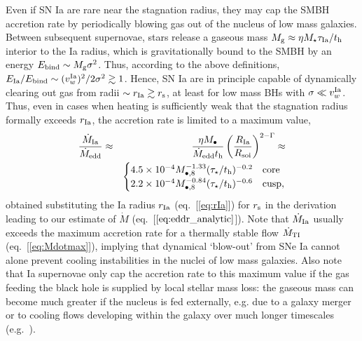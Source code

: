 \documentclass[usenatbib,fleqn]{mn2e}
\newcommand{\Mbheight}{M_{\bullet,8}}
\begin{document}
Even if SN Ia are rare near the stagnation radius, they may cap the SMBH accretion rate by periodically blowing gas out of the nucleus of low mass galaxies.  Between subsequent supernovae, stars release a gaseous mass $M_{\rm g} \approx \eta M_{\star}\tau_{\rm Ia}/t_{\rm h}$ interior to the Ia radius, which is gravitationally bound to the SMBH by an energy $E_{\rm bind} \sim M_{\rm g}\sigma^{2}$.  Thus, according to the above definitions, $E_{\rm Ia}/E_{\rm bind} \sim (v_{w}^{\rm Ia})^{2}/2\sigma^{2} \gtrsim 1$.  Hence, SN Ia are in principle capable of dynamically clearing out gas from radii $\sim r_{\rm Ia} \gtrsim r_{\rm s}$, at least for low mass BHs with $\sigma \ll v^{\rm Ia}_{w}$.  Thus, even in cases when heating is sufficiently weak that the stagnation radius formally exceeds $r_{\rm Ia}$, the accretion rate is limited to a maximum value, 
\begin{eqnarray}
\frac{\dot{M}_{\rm Ia}}{\dot{M}_{\rm edd}} &\approx& \frac{\eta M_{\bullet}}{\dot{M}_{\rm edd} t_{\rm h}}\left(\frac{R_{\rm Ia}}{R_{\rm soi}}\right)^{2-\Gamma} \approx \nonumber \\
 && \begin{cases}
    4.5 \times 10^{-4} M_{\bullet,8}^{-1.33}(\tau_{\star}/t_{\rm h})^{-0.2}
   & \text{core} \\
    2.2 \times 10^{-4} \Mbheight^{-0.84}(\tau_{\star}/t_{\rm h})^{-0.6}   & \text{cusp},
  \end{cases}
  \label{eq:eddr_Ia}
\end{eqnarray}
obtained substituting the Ia radius $r_{\rm Ia}$ (eq.~[\ref{eq:rIa}]) for $r_{\rm s}$ in the derivation leading to our estimate of $\dot{M}$ (eq.~[$\ref{eq:eddr_analytic}$]).  Note that $\dot{M}_{\rm Ia}$ usually exceeds the maximum accretion rate for a thermally stable flow $\dot{M}_{\rm TI}$ (eq.~[\ref{eq:Mdotmax}]), implying that dynamical `blow-out' from SNe Ia cannot alone prevent cooling instabilities in the nuclei of low mass galaxies.  Also note that Ia supernovae only cap the accretion rate to this maximum value if the gas feeding the black hole is supplied by local stellar mass loss: the gaseous mass can become much greater if the nucleus is fed externally, e.g. due to a galaxy merger or to cooling flows developing within the galaxy over much longer timescales (e.g.~\citealt{Ciotti&Ostriker07}). 
\end{document}
